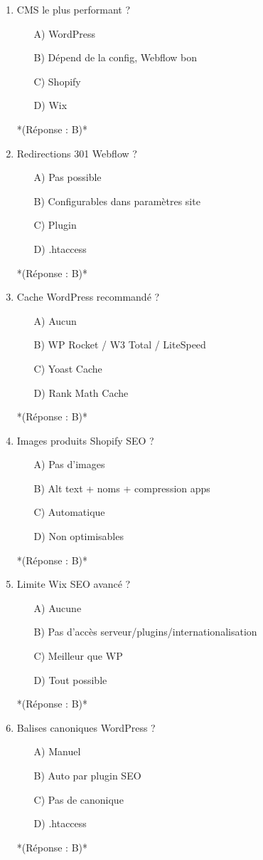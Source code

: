 \documentclass[12pt,a4paper,twoside]{report}
\begin{document}
\begin{enumerate}
\item CMS le plus performant ?
\begin{itemize}
\item[A)] WordPress
\item[B)] Dépend de la config, Webflow bon
\item[C)] Shopify
\item[D)] Wix
\end{itemize}
*(Réponse : B)*

\item Redirections 301 Webflow ?
\begin{itemize}
\item[A)] Pas possible
\item[B)] Configurables dans paramètres site
\item[C)] Plugin
\item[D)] .htaccess
\end{itemize}
*(Réponse : B)*

\item Cache WordPress recommandé ?
\begin{itemize}
\item[A)] Aucun
\item[B)] WP Rocket / W3 Total / LiteSpeed
\item[C)] Yoast Cache
\item[D)] Rank Math Cache
\end{itemize}
*(Réponse : B)*

\item Images produits Shopify SEO ?
\begin{itemize}
\item[A)] Pas d'images
\item[B)] Alt text + noms + compression apps
\item[C)] Automatique
\item[D)] Non optimisables
\end{itemize}
*(Réponse : B)*

\item Limite Wix SEO avancé ?
\begin{itemize}
\item[A)] Aucune
\item[B)] Pas d'accès serveur/plugins/internationalisation
\item[C)] Meilleur que WP
\item[D)] Tout possible
\end{itemize}
*(Réponse : B)*

\item Balises canoniques WordPress ?
\begin{itemize}
\item[A)] Manuel
\item[B)] Auto par plugin SEO
\item[C)] Pas de canonique
\item[D)] .htaccess
\end{itemize}
*(Réponse : B)*


\end{enumerate}
\end{document}
